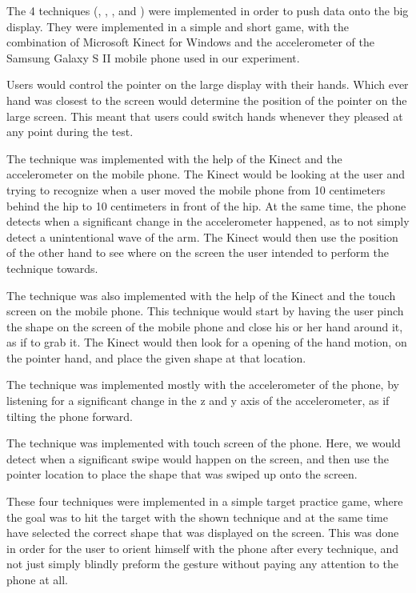 The 4 techniques (\swipe, \tilt, \throw, and \pinch) were implemented in order to push data onto the big display. They were implemented in a simple and short game, with the combination of Microsoft Kinect for Windows and the accelerometer of the Samsung Galaxy S II mobile phone used in our experiment. 

Users would control the pointer on the large display with their hands. 
Which ever hand was closest to the screen would determine the position of the pointer on the large screen. 
This meant that users could switch hands whenever they pleased at any point during the test. 

The \throw technique was implemented with the help of the Kinect and the accelerometer on the mobile phone. 
The Kinect would be looking at the user and trying to recognize when a user moved the mobile phone from 10 centimeters behind the hip to 10 centimeters in front of the hip. 
At the same time, the phone detects when a significant change in the accelerometer happened, as to not simply detect a unintentional wave of the arm. 
The Kinect would then use the position of the other hand to see where on the screen the user intended to perform the \throw technique towards. 

The \pinch technique was also implemented with the help of the Kinect and the touch screen on the mobile phone. 
This technique would start by having the user pinch the shape on the screen of the mobile phone and close his or her hand around it, as if to grab it. 
The Kinect would then look for a opening of the hand motion, on the pointer hand, and place the given shape at that location. 

The \tilt technique was implemented mostly with the accelerometer of the phone, by listening for a significant change in the z and y axis of the accelerometer, as if tilting the phone forward. 

The \swipe technique was implemented with touch screen of the phone. 
Here, we would detect when a significant swipe would happen on the screen, and then use the pointer location to place the shape that was swiped up onto the screen. 

These four techniques were implemented in a simple target practice game, where the goal was to hit the target with the shown technique and at the same time have selected the correct shape that was displayed on the screen. 
This was done in order for the user to orient himself with the phone after every technique, and not just simply blindly preform the gesture without paying any attention to the phone at all.  

